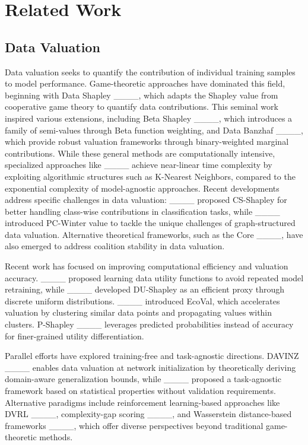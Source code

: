 \section{Related Work}
\label{sec:related}
\subsection{Data Valuation}\label{sec:related_dv}

Data valuation seeks to quantify the contribution of individual training samples to model performance. Game-theoretic approaches have dominated this field, beginning with Data Shapley ____, which adapts the Shapley value from cooperative game theory to quantify data contributions. This seminal work inspired various extensions, including Beta Shapley ____, which introduces a family of semi-values through Beta function weighting, and Data Banzhaf ____, which provide robust valuation frameworks through binary-weighted marginal contributions. While these general methods are computationally intensive, specialized approaches like ____ achieve near-linear time complexity by exploiting algorithmic structures such as K-Nearest Neighbors, compared to the exponential complexity of model-agnostic approaches. Recent developments address specific challenges in data valuation: ____ proposed CS-Shapley for better handling class-wise contributions in classification tasks, while ____ introduced PC-Winter value to tackle the unique challenges of graph-structured data valuation. Alternative theoretical frameworks, such as the Core ____, have also emerged to address coalition stability in data valuation. 

Recent work has focused on improving computational efficiency and valuation accuracy. ____ proposed learning data utility functions to avoid repeated model retraining, while ____ developed DU-Shapley as an efficient proxy through discrete uniform distributions. ____ introduced EcoVal, which accelerates valuation by clustering similar data points and propagating values within clusters. P-Shapley ____ leverages predicted probabilities instead of accuracy for finer-grained utility differentiation. 

Parallel efforts have explored training-free and task-agnostic directions. DAVINZ ____ enables data valuation at network initialization by theoretically deriving domain-aware generalization bounds, while ____ proposed a task-agnostic framework based on statistical properties without validation requirements. Alternative paradigms include reinforcement learning-based approaches like DVRL ____, complexity-gap scoring ____, and Wasserstein distance-based frameworks ____, which offer diverse perspectives beyond traditional game-theoretic methods.


